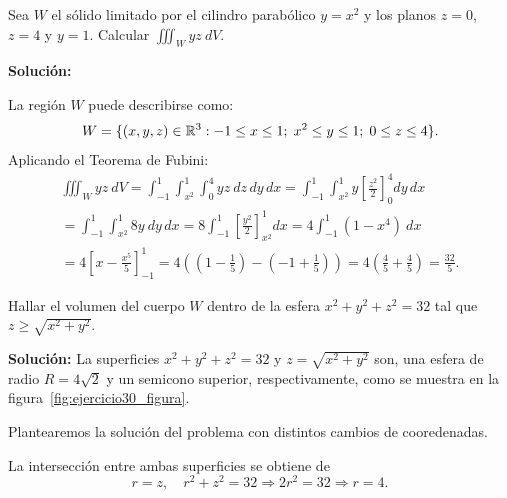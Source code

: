 
\begin{example}
Sea $W$ el sólido limitado por el cilindro parabólico $y = x^2$ y los planos $z = 0$, $z = 4$ y $y = 1$. Calcular $\iiint_W yz \: dV$. 
\end{example}


\textbf{Soluci\'on:}
\begin{figure}[htbp]
    \centering
     
    \label{fig:ejemplo 8.2.2}
\end{figure}

La región $W$ puede describirse como:
\[
    W = \{ (x,y,z) \in \mathbb{R}^3 : -1 \leq x \leq 1; \; x^2 \leq y \leq 1; \; 0 \leq z \leq 4 \}.
\]
Aplicando el Teorema de Fubini:
\begin{gather*}
    \iiint_W yz \: dV = \int_{-1}^{1} \int_{x^2}^{1} \int_{0}^{4} yz \: dz \, dy \, dx = \int_{-1}^{1} \int_{x^2}^{1} y \left[ \frac{z^2}{2} \right]_0^4 dy \, dx \\
    = \int_{-1}^{1} \int_{x^2}^{1} 8y \: dy \, dx = 8 \int_{-1}^{1} \left[ \frac{y^2}{2} \right]_{x^2}^1 dx = 4 \int_{-1}^{1} (1 - x^4) \: dx \\
    = 4 \left[ x - \frac{x^5}{5} \right]_{-1}^1 = 4 \left( \left( 1 - \frac{1}{5} \right) - \left( -1 + \frac{1}{5} \right) \right) = 4 \left( \frac{4}{5} + \frac{4}{5} \right) = \frac{32}{5}.
\end{gather*}


\clearpage

\begin{example}  Hallar el volumen del cuerpo $W$  dentro de la esfera  \(x^2+y^2+z^2=32\)  tal que
\(z \geq \sqrt{x^2+y^2}\).
\end{example}

\begin{figure}[htbp]
    \centering
     
    \label{fig:Ejemplo 8.2.3}
\end{figure}


\textbf{Soluci\'on:} La superficies $x^2+y^2+z^2=32$  y  $z=\sqrt{x^2+y^2}$ son,  una esfera de radio \(R=4\sqrt{2}\)    y un semicono superior, respectivamente, como se muestra en la figura~\ref{fig:ejercicio30_figura}. 


Plantearemos  la soluci\'on del problema con distintos cambios de cooredenadas. 



La intersección entre  ambas superficies se obtiene de
\[
r=z, \quad r^2+z^2=32 \Rightarrow 2r^2=32 \Rightarrow r=4.
\]

